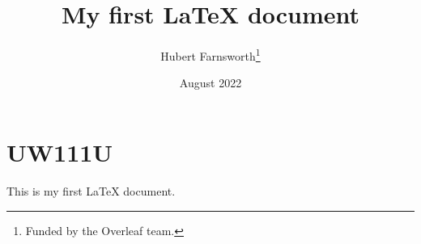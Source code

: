 \documentclass[12pt, letterpaper]{article}
\title{My first LaTeX document}
\author{Hubert Farnsworth\thanks{Funded by the Overleaf team.}}
\date{August 2022}
\begin{document}
\maketitle
\section{UW111U}
\label{sec:intro}
This is my first LaTeX document.
\end{document}
